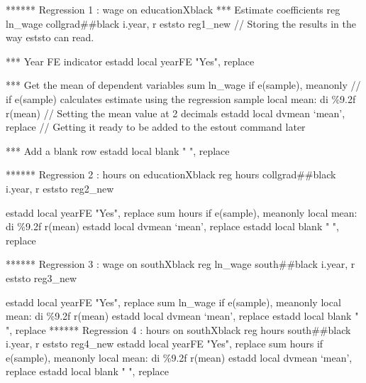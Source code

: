 {\smallskip}
****** Regression 1 : wage on educationXblack
{\smallskip}
        *** Estimate coefficients
        reg ln_wage collgrad\#\#black i.year, r
        eststo reg1_new // Storing the results in the way eststo can read.
                
        *** Year FE indicator
        estadd local yearFE "Yes", replace 
        
        *** Get the mean of dependent variables 
        sum ln_wage if e(sample), meanonly // if e(sample) calculates estimate using the regression sample
        local mean: di \%9.2f r(mean) // Setting the mean value at 2 decimals
        estadd local dvmean `mean', replace // Getting it ready to be added to the estout command later
        
        *** Add a blank row 
        estadd local blank " ", replace
        
{\smallskip}
****** Regression 2 : hours on educationXblack
{\smallskip}
        reg hours collgrad\#\#black i.year, r
        eststo reg2_new
        
        estadd local yearFE "Yes", replace 
        sum hours if e(sample), meanonly 
        local mean: di \%9.2f r(mean) 
        estadd local dvmean `mean', replace 
        estadd local blank " ", replace
        
{\smallskip}
{\smallskip}
****** Regression 3 : wage on southXblack
{\smallskip}
        reg ln_wage south\#\#black i.year, r
        eststo reg3_new
        
        estadd local yearFE "Yes", replace 
        sum ln_wage if e(sample), meanonly 
        local mean: di \%9.2f r(mean) 
        estadd local dvmean `mean', replace 
        estadd local blank " ", replace
{\smallskip}
{\smallskip}
****** Regression 4 : hours on southXblack              
{\smallskip}
        reg hours south\#\#black i.year, r
        eststo reg4_new
{\smallskip}
        estadd local yearFE "Yes", replace 
        sum hours if e(sample), meanonly 
        local mean: di \%9.2f r(mean) 
        estadd local dvmean `mean', replace 
        estadd local blank " ", replace
        

